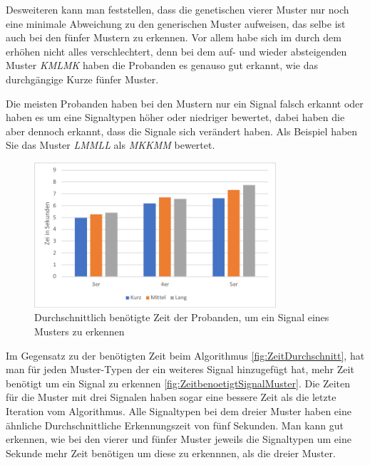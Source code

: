 Desweiteren kann man feststellen, dass die genetischen vierer Muster nur noch eine minimale Abweichung zu den generischen Muster aufweisen, das selbe ist auch bei den f{\"u}nfer Mustern zu erkennen.
Vor allem habe sich im durch dem erh{\"o}hen nicht alles verschlechtert, denn bei dem auf- und wieder absteigenden Muster \textit{KMLMK} haben die Probanden es genauso gut erkannt, wie das durchg{\"a}ngige Kurze f{\"u}nfer Muster. 

Die meisten Probanden haben bei den Mustern nur ein Signal falsch erkannt oder haben es um eine Signaltypen h{\"o}her oder niedriger bewertet, dabei  haben die aber dennoch erkannt, dass die Signale sich ver{\"a}ndert haben. Als Beispiel haben Sie das Muster \textit{LMMLL} als \textit{MKKMM} bewertet. \\

\begin{figure}[htbp] 
            \centering
   	\includegraphics[width=0.8\textwidth]{pics/analyse/algo/ZeitbenoetigtSignalMuster.png}
	\caption{Durchschnittlich ben{\"o}tigte Zeit der Probanden, um ein Signal eines Musters zu erkennen}
	\label{fig:ZeitbenoetigtSignalMuster}
\end{figure}
Im Gegensatz zu der ben{\"o}tigten Zeit beim Algorithmus \autoref{fig:ZeitDurchschnitt}, hat man f{\"u}r jeden Muster-Typen der ein weiteres Signal hinzugef{\"u}gt hat, mehr Zeit ben{\"o}tigt um ein Signal zu erkennen \autoref{fig:ZeitbenoetigtSignalMuster}. 
Die Zeiten f{\"u}r die Muster mit drei Signalen haben sogar eine bessere Zeit als die letzte Iteration vom Algorithmus. 
Alle Signaltypen bei dem dreier Muster haben eine {\"a}hnliche Durchschnittliche Erkennungszeit von f{\"u}nf Sekunden.
Man kann gut erkennen, wie bei den vierer und f{\"u}nfer Muster jeweils die Signaltypen um eine Sekunde mehr Zeit ben{\"o}tigen um diese zu erkennnen, als die dreier Muster.

